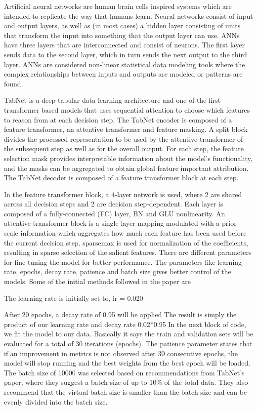 \documentclass[conference,final,]{IEEEtran}
\begin{document}
Artificial neural networks are human brain cells inspired systems which
are intended to replicate the way that humans learn. Neural networks
consist of input and output layers, as well as (in most cases) a hidden
layer consisting of units that transform the input into something that
the output layer can use. ANNs have three layers that are interconnected
and consist of neurons. The first layer sends data to the second layer,
which in turn sends the next output to the third layer. ANNs are
considered non-linear statistical data modeling tools where the complex
relationships between inputs and outputs are modeled or patterns are
found.

TabNet is a deep tabular data learning architecture and one of the first
transformer based models that uses sequential attention to choose which
features to reason from at each decision step. The TabNet encoder is
composed of a feature transformer, an attentive transformer and feature
masking. A split block divides the processed representation to be used
by the attentive transformer of the subsequent step as well as for the
overall output. For each step, the feature selection mask provides
interpretable information about the model's functionality, and the masks
can be aggregated to obtain global feature important attribution. The
TabNet decoder is composed of a feature transformer block at each step.

In the feature transformer block, a 4-layer network is used, where 2 are
shared across all decision steps and 2 are decision step-dependent. Each
layer is composed of a fully-connected (FC) layer, BN and GLU
nonlinearity. An attentive transformer block is a single layer mapping
modulated with a prior scale information which aggregates how much each
feature has been used before the current decision step. sparsemax is
used for normalization of the coefficients, resulting in sparse
selection of the salient features. There are different parameters for
fine tuning the model for better performance. The parameters like
learning rate, epochs, decay rate, patience and batch size gives better
control of the models. Some of the initial methods followed in the paper
are

The learning rate is initially set to, lr = 0.020

After 20 epochs, a decay rate of 0.95 will be applied The result is
simply the product of our learning rate and decay rate 0.02*0.95 In the
next block of code, we fit the model to our data. Basically it says the
train and validation sets will be evaluated for a total of 30 iterations
(epochs). The patience parameter states that if an improvement in
metrics is not observed after 30 consecutive epochs, the model will stop
running and the best weights from the best epoch will be loaded. The
batch size of 10000 was selected based on recommendations from TabNet's
paper, where they suggest a batch size of up to 10\% of the total data.
They also recommend that the virtual batch size is smaller than the
batch size and can be evenly divided into the batch size.
\end{document}
